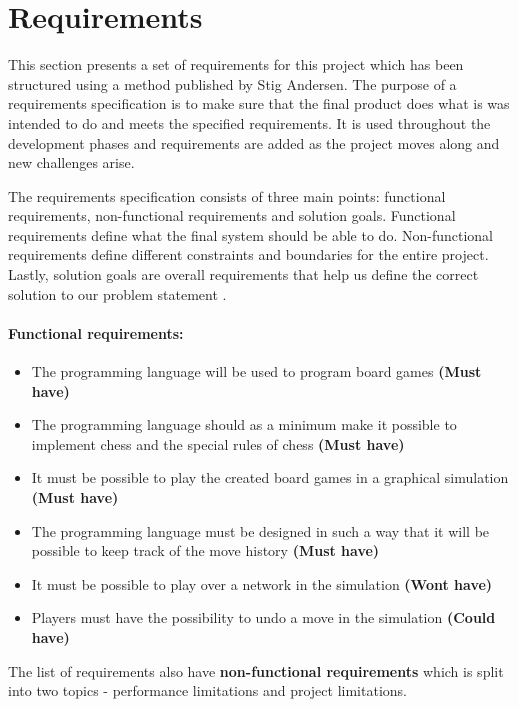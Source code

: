 \section{Requirements}
This section presents a set of requirements for this project which has been structured using a method published by Stig Andersen\cite{dengodekravspecifikation}. The purpose of a requirements specification is to make sure that the final product does what is was intended to do and meets the specified requirements. It is used throughout the development phases and requirements are added as the project moves along and new challenges arise.

The requirements specification consists of three main points: functional requirements, non-functional requirements and solution goals. Functional requirements define what the final system should be able to do. Non-functional requirements define different constraints and boundaries for the entire project. Lastly, solution goals are overall requirements that help us define the correct solution to our problem statement \cite{requirementsGuide}.


\paragraph*{Functional requirements:}
\begin{itemize}[noitemsep]
  \item The programming language will be used to program board games \textbf{(Must have)}
  \item The programming language should as a minimum make it possible to implement chess and the special rules of chess \textbf{(Must have)}
  \item It must be possible to play the created board games in a graphical simulation \textbf{(Must have)}
  \item The programming language must be designed in such a way that it will be possible to keep track of the move history \textbf{(Must have)}
  \item It must be possible to play over a network in the simulation \textbf{(Wont have)}
  \item Players must have the possibility to undo a move in the simulation \textbf{(Could have)}
\end{itemize}

The list of requirements also have \textbf{non-functional requirements} which is split into two topics - performance limitations and project limitations.

